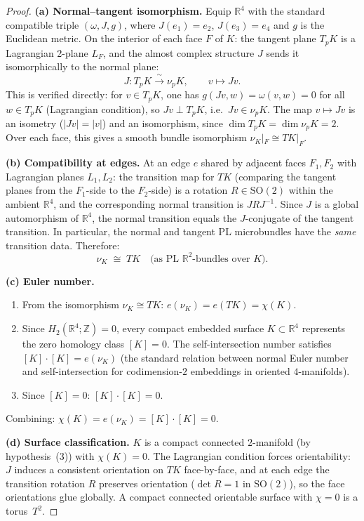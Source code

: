 \begin{proof}
\textbf{(a) Normal--tangent isomorphism.}
Equip $\mathbb R^4$ with the standard compatible triple $(\omega,J,g)$, where
$J(e_1)=e_2$, $J(e_3)=e_4$ and $g$ is the Euclidean metric.
On the interior of each face $F$ of $K$: the tangent plane $T_pK$ is a Lagrangian 2-plane $L_F$,
and the almost complex structure $J$ sends it isomorphically to the normal plane:
\[
J\colon T_pK \xrightarrow{\;\sim\;} \nu_pK, \qquad v\mapsto Jv.
\]
This is verified directly: for $v\in T_pK$, one has $g(Jv,w)=\omega(v,w)=0$ for all $w\in T_pK$
(Lagrangian condition), so $Jv\perp T_pK$, i.e.\ $Jv\in\nu_pK$.
The map $v\mapsto Jv$ is an isometry ($|Jv|=|v|$) and an isomorphism, since $\dim T_pK=\dim\nu_pK=2$.
Over each face, this gives a smooth bundle isomorphism $\nu_K|_F\cong TK|_F$.

\textbf{(b) Compatibility at edges.}
At an edge $e$ shared by adjacent faces $F_1,F_2$ with Lagrangian planes $L_1,L_2$:
the transition map for $TK$ (comparing the tangent planes from the $F_1$-side to the $F_2$-side)
is a rotation $R\in\mathrm{SO}(2)$ within the ambient $\mathbb R^4$, and the corresponding normal
transition is $JRJ^{-1}$.  Since $J$ is a global automorphism of $\mathbb R^4$, the normal transition
equals the $J$-conjugate of the tangent transition.  In particular, the normal and tangent
PL microbundles have the \emph{same} transition data.  Therefore:
\[
\nu_K\;\cong\; TK \quad\text{(as PL $\mathbb R^2$-bundles over $K$).}
\]

\textbf{(c) Euler number.}
\begin{enumerate}
\item From the isomorphism $\nu_K\cong TK$:
  $e(\nu_K)=e(TK)=\chi(K)$.
\item Since $H_2(\mathbb R^4;\mathbb Z)=0$, every compact embedded surface $K\subset\mathbb R^4$
  represents the zero homology class $[K]=0$.
  The self-intersection number satisfies
  $[K]\cdot[K]=e(\nu_K)$
  (the standard relation between normal Euler number and self-intersection for
  codimension-$2$ embeddings in oriented $4$-manifolds).
\item Since $[K]=0$: $[K]\cdot[K]=0$.
\end{enumerate}
Combining: $\chi(K)=e(\nu_K)=[K]\cdot[K]=0$.

\textbf{(d) Surface classification.}
$K$ is a compact connected $2$-manifold (by hypothesis~(3)) with $\chi(K)=0$.
The Lagrangian condition forces orientability: $J$ induces a consistent
orientation on $TK$ face-by-face, and at each edge the transition rotation $R$ preserves
orientation ($\det R=1$ in $\mathrm{SO}(2)$), so the face orientations glue globally.
A compact connected orientable surface with $\chi=0$ is a torus~$T^2$.
\end{proof}

